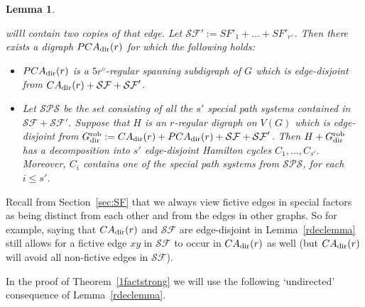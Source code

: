\documentclass{memo-l}
\newtheorem{lemma}[firstthm]{Lemma}
\numberwithin{section}{chapter}
\numberwithin{equation}{section}
\numberwithin{firstthm}{section}
\numberwithin{figure}{section}
\begin{document}
\begin{lemma}
\begin{itemize}
{willl contain two copies of that edge.} 
Let $\mathcal{SF}':=SF'_1+\dots +SF'_{r^\diamond}$.
Then there exists a digraph $PCA_{{\rm dir}}(r)$ for which the following holds:
\begin{itemize}
\item[\rm (a)] $PCA_{{\rm dir}}(r)$ is a $5r^\diamond$-regular spanning subdigraph of $G$ which
is edge-disjoint from $CA_{{\rm dir}}(r)+ \mathcal{SF}+ \mathcal{SF}'$.
\item[\rm (b)] Let $\mathcal{SPS}$ be the set consisting of all the $s'$ special path systems
contained in $\mathcal{SF}+ \mathcal{SF}'$.
Suppose that $H$ is an $r$-regular digraph on $V(G)$ which is edge-disjoint from $G^{\rm rob}_{\rm dir}:=CA_{{\rm dir}}(r)+ PCA_{{\rm dir}}(r)+ \mathcal{SF}+ \mathcal{SF}'$.
Then $H+G^{\rm rob}_{\rm dir}$ has a decomposition into $s'$
edge-disjoint Hamilton cycles $C_1,\dots,C_{s'}$.
Moreover, $C_i$ contains one of the special path systems from $\mathcal{SPS}$, for each $i\le s'$.
\end{itemize}
\end{itemize}
\end{lemma}




Recall from Section~\ref{sec:SF} that we always view fictive edges in special factors as being distinct from each other and
from the edges in other graphs. So for example, saying that $CA_{{\rm dir}}(r)$ and $\mathcal{SF}$ are edge-disjoint in
Lemma~\ref{rdeclemma} still allows for a fictive edge $xy$ in $\mathcal{SF}$ to occur in $CA_{{\rm dir}}(r)$ as well
(but $CA_{{\rm dir}}(r)$ will avoid all non-fictive edges in $\mathcal{SF}$).

In the proof of Theorem~\ref{1factstrong} we will use the following `undirected' consequence of Lemma~\ref{rdeclemma}.
\end{document}
